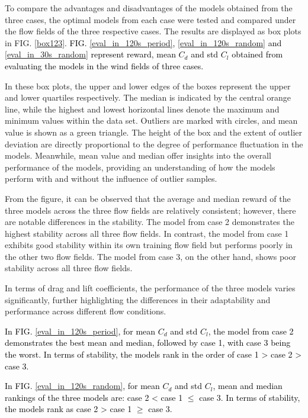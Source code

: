 \documentclass[%
 aip,
 amsmath,amssymb,
 reprint,%
]{revtex4-1}
\newcommand{\black}[1]{\textcolor{black}{#1}}
\begin{document}
To compare the advantages and disadvantages of the models obtained from the three cases, the optimal models from each case were tested and compared under the flow fields of the three respective cases. The results are displayed as box plots in FIG. \ref{box123}. \black{FIG. \ref{eval_in_120s_period}, \ref{eval_in_120s_random} and \ref{eval_in_30s_random} represent reward, mean $C_d$ and std $C_l$ obtained from evaluating the models in the wind fields of three cases.}

In these box plots, the upper and lower edges of the boxes represent the upper and lower quartiles respectively. The median is indicated by the central orange line, while the highest and lowest horizontal lines denote the maximum and minimum values within the data set. Outliers are marked with circles, and mean value is shown as a green triangle. The height of the box and the extent of outlier deviation are directly proportional to the degree of performance fluctuation in the models. Meanwhile, mean value and median offer insights into the overall performance of the models, providing an understanding of how the models perform with and without the influence of outlier samples. 

From the figure, it can be observed that the average and median reward of the three models across the three flow fields are relatively consistent; however, there are notable differences in the stability. The model from case 2 demonstrates the highest stability across all three flow fields. In contrast, the model from case 1 exhibits good stability within its own training flow field but performs poorly in the other two flow fields. The model from case 3, on the other hand, shows poor stability across all three flow fields.

In terms of drag and lift coefficients, the performance of the three models varies significantly, further highlighting the differences in their adaptability and performance across different flow conditions.

\black{In FIG. \ref{eval_in_120s_period}, for mean $C_d$ and std $C_l$, the model from case 2 demonstrates the best mean and median, followed by case 1, with case 3 being the worst. In terms of stability, the models rank in the order of case 1 > case 2 > case 3.}

\black{In FIG. \ref{eval_in_120s_random}, for mean $C_d$ and std $C_l$, mean and median rankings of the three models are: case 2 < case 1 $\le$ case 3. In terms of stability, the models rank as case 2 > case 1 $\ge$ case 3.}
\end{document}
